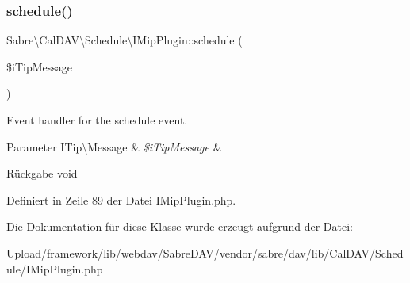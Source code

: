 \subsubsection{\texorpdfstring{schedule()}{schedule()}}
{\footnotesize\ttfamily Sabre\textbackslash{}\+Cal\+D\+A\+V\textbackslash{}\+Schedule\textbackslash{}\+I\+Mip\+Plugin\+::schedule (\begin{DoxyParamCaption}\item[{\mbox{\hyperlink{class_sabre_1_1_v_object_1_1_i_tip_1_1_message}{I\+Tip\textbackslash{}\+Message}}}]{\$i\+Tip\+Message }\end{DoxyParamCaption})}

Event handler for the \textquotesingle{}schedule\textquotesingle{} event.


\begin{DoxyParams}[1]{Parameter}
I\+Tip\textbackslash{}\+Message & {\em \$i\+Tip\+Message} & \\
\hline
\end{DoxyParams}
\begin{DoxyReturn}{Rückgabe}
void 
\end{DoxyReturn}


Definiert in Zeile 89 der Datei I\+Mip\+Plugin.\+php.



Die Dokumentation für diese Klasse wurde erzeugt aufgrund der Datei\+:\begin{DoxyCompactItemize}
\item 
Upload/framework/lib/webdav/\+Sabre\+D\+A\+V/vendor/sabre/dav/lib/\+Cal\+D\+A\+V/\+Schedule/I\+Mip\+Plugin.\+php\end{DoxyCompactItemize}
